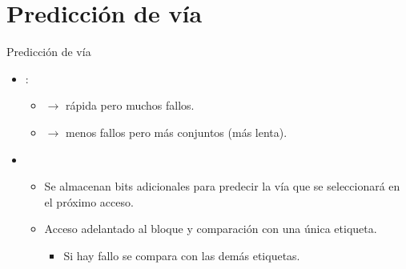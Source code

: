 \section{Predicción de vía}

\begin{frame}[t]{Predicción de vía}
\begin{itemize}
  \item {}:
    \begin{itemize}
      \item {} $\rightarrow$ rápida pero muchos fallos.
      \item {} $\rightarrow$ menos fallos pero más conjuntos (más lenta).
    \end{itemize}

  \item {}
    \begin{itemize}
      \item Se almacenan bits adicionales para predecir la vía que se seleccionará en el próximo acceso.
      \item Acceso adelantado al bloque y comparación con una única etiqueta.
        \begin{itemize}
          \item Si hay fallo se compara con las demás etiquetas.
        \end{itemize}
    \end{itemize}
\end{itemize}
\end{frame}
